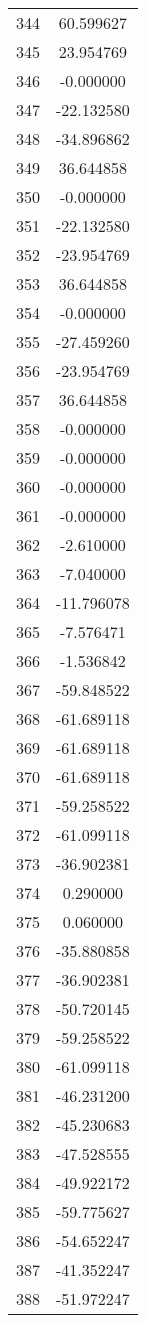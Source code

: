 \documentclass[12pt]{article}
\begin{document}
\begin{longtable}{@{}cc@{}}
344 & 60.599627 \\
345 & 23.954769 \\
346 & -0.000000 \\
347 & -22.132580 \\
348 & -34.896862 \\
349 & 36.644858 \\
350 & -0.000000 \\
351 & -22.132580 \\
352 & -23.954769 \\
353 & 36.644858 \\
354 & -0.000000 \\
355 & -27.459260 \\
356 & -23.954769 \\
357 & 36.644858 \\
358 & -0.000000 \\
359 & -0.000000 \\
360 & -0.000000 \\
361 & -0.000000 \\
362 & -2.610000 \\
363 & -7.040000 \\
364 & -11.796078 \\
365 & -7.576471 \\
366 & -1.536842 \\
367 & -59.848522 \\
368 & -61.689118 \\
369 & -61.689118 \\
370 & -61.689118 \\
371 & -59.258522 \\
372 & -61.099118 \\
373 & -36.902381 \\
374 & 0.290000 \\
375 & 0.060000 \\
376 & -35.880858 \\
377 & -36.902381 \\
378 & -50.720145 \\
379 & -59.258522 \\
380 & -61.099118 \\
381 & -46.231200 \\
382 & -45.230683 \\
383 & -47.528555 \\
384 & -49.922172 \\
385 & -59.775627 \\
386 & -54.652247 \\
387 & -41.352247 \\
388 & -51.972247 \\

\end{longtable}
\end{document}
